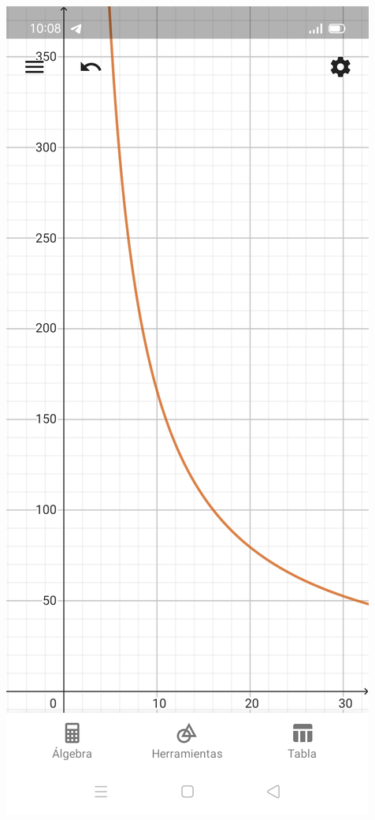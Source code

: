 \documentclass{article}
\begin{document}
\begin{center}
  \includegraphics[scale=0.2]{Imagenes/b_1500.jpg}\\
\end{center}
\end{document}
